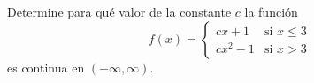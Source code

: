 \setcounter{enumi}{44}
\item Determine para qué valor de la constante $c$ la función
$$f(x) = \begin{cases} cx + 1 & \text{si } x \le 3 \\ cx^2 - 1 & \text{si } x > 3 \end{cases}$$
es continua en $(-\infty, \infty)$.
